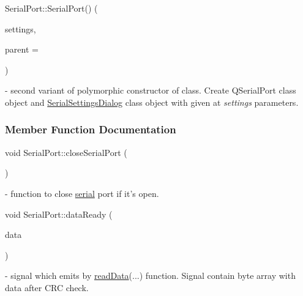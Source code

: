 \mbox{\label{classSerialPort_aa9fb64a8aced84ab80eee65680298976}} 
{\footnotesize\ttfamily Serial\+Port\+::\texorpdfstring{Serial\+Port()}{SerialPort()}{\footnotesize\ttfamily [2/2]} (\begin{DoxyParamCaption}\item[{\mbox{\hyperlink{structComSettings}{Com\+Settings}}}]{settings,  }\item[{Q\+Object $\ast$}]{parent = {} }\end{DoxyParamCaption})\hspace{0.3cm}{\ttfamily [explicit]}} - second variant of polymorphic constructor of class. Create Q\+Serial\+Port class object and \hyperlink{classSerialSettingsDialog}{Serial\+Settings\+Dialog} class object with given at \textit{settings} parameters.



\subsubsection{Member Function Documentation}
\mbox{\label{classSerialPort_a075482970cd99f66457eac471127a710}} 
{\footnotesize\ttfamily void Serial\+Port\+::\texorpdfstring{close\+Serial\+Port}{closeSerialPort} (\begin{DoxyParamCaption}{ }\end{DoxyParamCaption})\hspace{0.3cm}{\ttfamily [slot]}} - function to close \hyperlink{classSerialPort_a54120d9040537e637eae7e8c048dec31}{serial} port if it's open.

\mbox{\label{classSerialPort_a4653f9aa7114546faa5627ee5810a47d}} 
{\footnotesize\ttfamily void Serial\+Port\+::\texorpdfstring{data\+Ready}{dataReady}{\footnotesize\ttfamily [1/2]} (\begin{DoxyParamCaption}\item[{Q\+Byte\+Array}]{data }\end{DoxyParamCaption})\hspace{0.3cm}{\ttfamily [signal]}} - signal which emits by \hyperlink{classSerialPort_a0b8fe1371e829199856e8cae942de94e}{read\+Data}(...) function. Signal contain byte array with data after C\+R\+C check.

